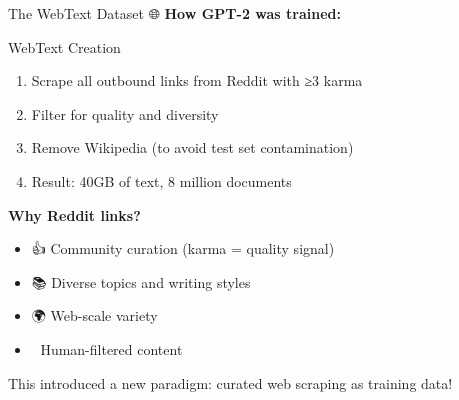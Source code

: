 \documentclass[aspectratio=169]{beamer}
\begin{document}
\begin{frame}[shrink=10]{The WebText Dataset 🌐}
\small
    \textbf{How GPT-2 was trained:}

    \vspace{0.3cm}

    \begin{block}{WebText Creation}
        \begin{enumerate}\setlength{\itemsep}{0pt}
            \item Scrape all outbound links from Reddit with ≥3 karma
            \item Filter for quality and diversity
            \item Remove Wikipedia (to avoid test set contamination)
            \item Result: 40GB of text, 8 million documents
        \end{enumerate}
    \end{block}

    \vspace{0.3cm}

    \textbf{Why Reddit links?}
    \begin{itemize}\setlength{\itemsep}{0pt}
        \item 👍 Community curation (karma = quality signal)
        \item 📚 Diverse topics and writing styles
        \item 🌍 Web-scale variety
        \item 🎯 Human-filtered content
    \end{itemize}

    \vspace{0.3cm}

    \begin{thinkaboutit}
        This introduced a new paradigm: curated web scraping as training data!
    \end{thinkaboutit}
\end{frame}
\end{document}
